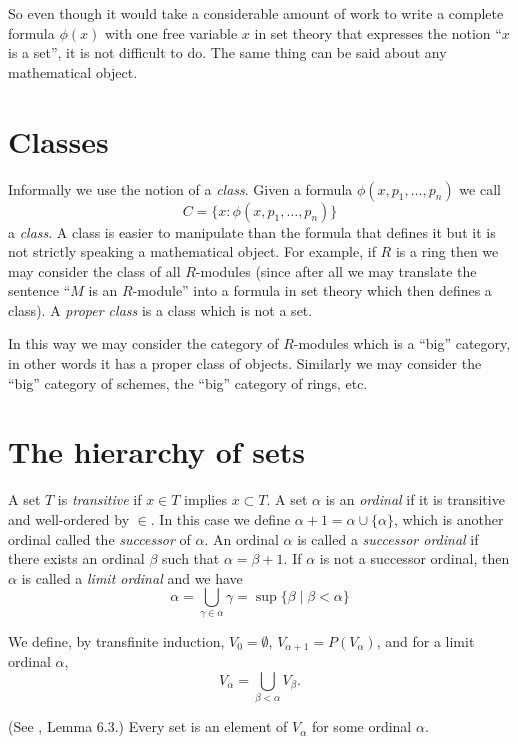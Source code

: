 \medskip\noindent
So even though it would take a considerable amount of work to write
a complete formula $\phi(x)$ with one free variable $x$ in set theory 
that expresses the notion ``$x$ is a set'', it is not difficult to do.
The same thing can be said about any mathematical object.

\section{Classes}
\label{section-classes}

\noindent
Informally we use the notion of a {\it class}. Given a formula
$\phi(x,p_1,\ldots,p_n)$ we call
$$
C = \{x : \phi(x,p_1,\ldots,p_n)\}
$$
a {\it class}. A class is easier to manipulate than the formula
that defines it but it is not strictly speaking a mathematical
object. For example, if $R$ is a ring then we may
consider the class of all $R$-modules (since after all we
may translate the sentence ``$M$ is an $R$-module''
into a formula in set theory which then defines a class).
A {\it proper class} is a class which is not a set.

\noindent
In this way we may consider the category of $R$-modules
which is a ``big'' category, in other words it has a
proper  class of objects. Similarly we may consider
the ``big'' category of schemes, the ``big'' category
of rings, etc.

\section{The hierarchy of sets}
\label{section-sets-hierarchy}

\noindent
A set $T$ is {\it transitive} if $x\in T$ implies $x\subset T$.
A set $\alpha$ is an {\it ordinal} if it is transitive and well-ordered
by $\in$. In this case we define $\alpha + 1 = \alpha \cup \{\alpha\}$,
which is another ordinal called the {\it successor} of $\alpha$.
An ordinal $\alpha$ is called a {\it successor ordinal} if 
there exists an ordinal $\beta$ such that $\alpha = \beta + 1$.
If $\alpha$ is not a successor ordinal, then $\alpha$ is called
a {\it limit ordinal} and we have
$$
\alpha 
=
\bigcup_{\gamma \in \alpha} \gamma
=
\sup \{\beta \mid \beta < \alpha \}
$$

\medskip\noindent
We define, by transfinite induction, $V_0 = \emptyset$,
$V_{\alpha + 1} = P(V_\alpha)$, and for a limit ordinal $\alpha$,
$$
V_\alpha = \bigcup_{\beta < \alpha} V_\beta.
$$

\begin{lemma}
\label{axiom-regularity}
(See \cite{Jech}, Lemma 6.3.)
Every set is an element of $V_\alpha$ for some ordinal $\alpha$.
\end{lemma}


